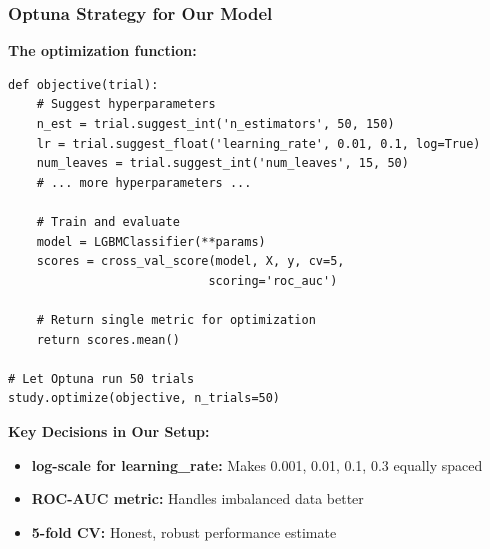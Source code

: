 \documentclass{beamer}
\begin{document}
\begin{frame}[fragile]
\frametitle{Optuna Strategy for Our Model}

\textbf{The optimization function:}

{\small
\begin{lstlisting}
def objective(trial):
    # Suggest hyperparameters
    n_est = trial.suggest_int('n_estimators', 50, 150)
    lr = trial.suggest_float('learning_rate', 0.01, 0.1, log=True)
    num_leaves = trial.suggest_int('num_leaves', 15, 50)
    # ... more hyperparameters ...

    # Train and evaluate
    model = LGBMClassifier(**params)
    scores = cross_val_score(model, X, y, cv=5,
                            scoring='roc_auc')

    # Return single metric for optimization
    return scores.mean()

# Let Optuna run 50 trials
study.optimize(objective, n_trials=50)
\end{lstlisting}
}

\vspace{0.2cm}
\textbf{Key Decisions in Our Setup:}

\begin{itemize}
    \item \textbf{log-scale for learning\_rate:} Makes 0.001, 0.01, 0.1, 0.3 equally spaced
    \item \textbf{ROC-AUC metric:} Handles imbalanced data better
    \item \textbf{5-fold CV:} Honest, robust performance estimate
\end{itemize}

\end{frame}
\end{document}
